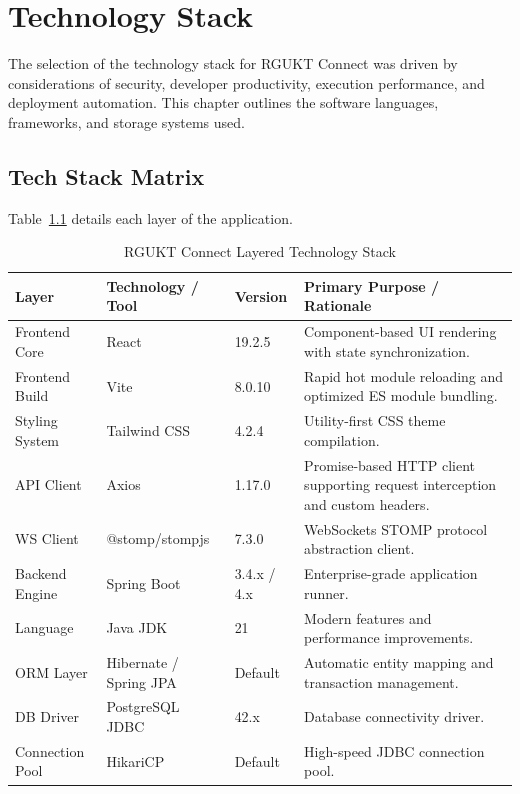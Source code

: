 \chapter{Technology Stack}
\label{ch:technology_stack}

The selection of the technology stack for RGUKT Connect was driven by considerations of security, developer productivity, execution performance, and deployment automation. This chapter outlines the software languages, frameworks, and storage systems used.

\section{Tech Stack Matrix}
Table~\ref{tab:tech_stack} details each layer of the application.

\begin{table}[H]
    \centering
    \caption{RGUKT Connect Layered Technology Stack}
    \label{tab:tech_stack}
    \begin{tabularx}{\textwidth}{l X l X}
        \toprule
        \textbf{Layer} & \textbf{Technology / Tool} & \textbf{Version} & \textbf{Primary Purpose / Rationale} \\
        \midrule
        Frontend Core & React & 19.2.5 & Component-based UI rendering with state synchronization. \\
        Frontend Build & Vite & 8.0.10 & Rapid hot module reloading and optimized ES module bundling. \\
        Styling System & Tailwind CSS & 4.2.4 & Utility-first CSS theme compilation. \\
        API Client & Axios & 1.17.0 & Promise-based HTTP client supporting request interception and custom headers. \\
        WS Client & @stomp/stompjs & 7.3.0 & WebSockets STOMP protocol abstraction client. \\
        Backend Engine & Spring Boot & 3.4.x / 4.x & Enterprise-grade application runner. \\
        Language & Java JDK & 21 & Modern features and performance improvements. \\
        ORM Layer & Hibernate / Spring JPA & Default & Automatic entity mapping and transaction management. \\
        DB Driver & PostgreSQL JDBC & 42.x & Database connectivity driver. \\
        Connection Pool & HikariCP & Default & High-speed JDBC connection pool. \\

\end{tabularx}
\end{table}

